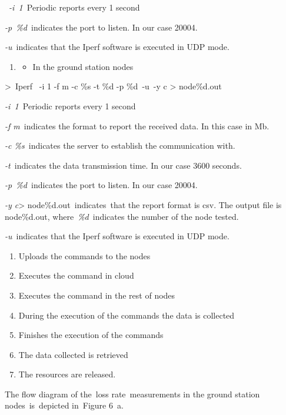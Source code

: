 \documentclass[a4paper]{article}
\newcounter{saveenum}
\newcommand\liststyleLFOviii{%
\renewcommand\theenumi{\arabic{enumi}}
\renewcommand\theenumii{\roman{enumii}}
\renewcommand\theenumiii{\arabic{enumiii}}
\renewcommand\labelenumi{\theenumi.}
\renewcommand\labelitemi{o}
\renewcommand\labelenumii{\theenumii.}
\renewcommand\labelenumiii{\theenumiii.}
}
\newcommand\liststyleLFOx{%
\renewcommand\theenumi{\arabic{enumi}}
\renewcommand\theenumii{\roman{enumii}}
\renewcommand\theenumiii{\arabic{enumiii}}
\renewcommand\labelenumi{\theenumi.}
\renewcommand\labelitemi{o}
\renewcommand\labelenumii{\theenumii.}
\renewcommand\labelenumiii{\theenumiii.}
}
\begin{document}
\ \textit{{}-i}\textit{\ 1\ }Periodic reports every 1 second

\textit{{}-p}\textit{\ }\textit{\%d}\textit{\ }indicates the port to
listen. In our case 20004.

\textit{{}-u}\ indicates that the Iperf software is executed in UDP
mode. \ 

\liststyleLFOviii
\setcounter{saveenum}{\value{enumi}}
\begin{enumerate}
\setcounter{enumi}{\value{saveenum}}
\item \begin{itemize}
\item In the ground station nodes
\end{itemize}
\end{enumerate}
{\textgreater}\ Iperf \ {}-i 1 -f m -c \%s -t \%d -p \%d\ {}-u\ {}-y c
{\textgreater} node\%d.out {\textquotedbl}

\textit{{}-i}\textit{\ 1\ }Periodic reports every 1 second

\textit{{}-f m}\ indicates the format to report the received data. In
this case in Mb.

\textit{{}-c \%s\ }indicates the server to establish the communication
with.

\textit{{}-t\ }indicates the data transmission time. In our case 3600
seconds.

\textit{{}-}\textit{p}\textit{\ }\textit{\%d}\textit{\ }indicates the
port to listen. In our case 20004.

\textit{{}-y c}{\textgreater} node\%d.out\textit{\ }indicates\ that the
report format is csv. The output file is node\%d.out,
where\ \textit{\%d}\ indicates the number of the node tested.

\textit{{}-u}\ indicates that the Iperf software is executed in UDP
mode. \ 


\bigskip

\liststyleLFOx
\setcounter{saveenum}{\value{enumi}}
\begin{enumerate}
\setcounter{enumi}{\value{saveenum}}
\item Uploads the commands to the nodes
\item Executes the command in cloud
\item Executes the command in the rest of nodes
\item During the execution of the commands the data is collected
\item Finishes the execution of the commands\ 
\item The data collected is retrieved\ 
\item The resources are released.
\end{enumerate}
The flow diagram of the\ loss rate\ measurements in the ground station
nodes\ is\ depicted in\ Figure 6\ a.
\end{document}
